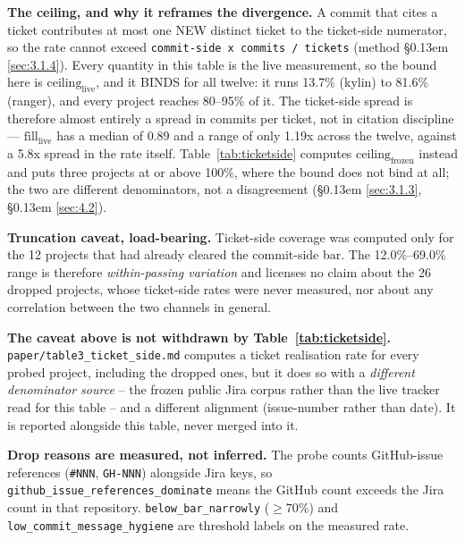 \documentclass[11pt,a4paper]{article}
\begin{document}
\begin{landscape}
\textbf{The ceiling, and why it reframes the divergence.} A commit that cites a ticket contributes at most one NEW distinct ticket to the ticket-side numerator, so the rate cannot exceed \texttt{commit-\allowbreak{}side x commits /\allowbreak{} tickets} (method \S\kern0.13em \ref{sec:3.1.4}). Every quantity in this table is the live measurement, so the bound here is $\mathrm{ceiling}_\mathrm{live}$, and it BINDS for all twelve: it runs 13.7\% (kylin) to 81.6\% (ranger), and every project reaches 80--95\% of it. The ticket-side spread is therefore almost entirely a spread in commits per ticket, not in citation discipline --- $\mathrm{fill}_\mathrm{live}$ has a median of 0.89 and a range of only 1.19x across the twelve, against a 5.8x spread in the rate itself. Table~\ref{tab:ticketside} computes $\mathrm{ceiling}_\mathrm{frozen}$ instead and puts three projects at or above 100\%, where the bound does not bind at all; the two are different denominators, not a disagreement (\S\kern0.13em \ref{sec:3.1.3}, \S\kern0.13em \ref{sec:4.2}).



\textbf{Truncation caveat, load-bearing.} Ticket-side coverage was computed only for the 12 projects that had already cleared the commit-side bar. The 12.0\%--69.0\% range is therefore \emph{within-passing variation} and licenses no claim about the 26 dropped projects, whose ticket-side rates were never measured, nor about any correlation between the two channels in general.



\textbf{The caveat above is not withdrawn by Table~\ref{tab:ticketside}.} \texttt{paper/\allowbreak{}table3\_\allowbreak{}ticket\_\allowbreak{}side.\allowbreak{}md} computes a ticket realisation rate for every probed project, including the dropped ones, but it does so with a \emph{different denominator source} -- the frozen public Jira corpus rather than the live tracker read for this table -- and a different alignment (issue-number rather than date). It is reported alongside this table, never merged into it.



\textbf{Drop reasons are measured, not inferred.} The probe counts GitHub-issue references (\texttt{\#NNN}, \texttt{GH-\allowbreak{}NNN}) alongside Jira keys, so \texttt{github\_\allowbreak{}issue\_\allowbreak{}references\_\allowbreak{}dominate} means the GitHub count exceeds the Jira count in that repository. \texttt{below\_\allowbreak{}bar\_\allowbreak{}narrowly} ($\geq$70\%) and \texttt{low\_\allowbreak{}commit\_\allowbreak{}message\_\allowbreak{}hygiene} are threshold labels on the measured rate.




\end{landscape}
\end{document}
